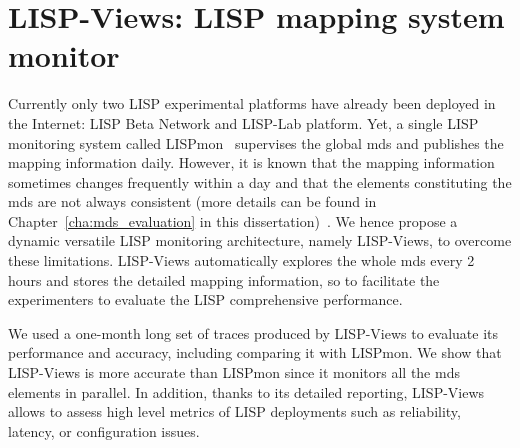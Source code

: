 
\chapter{LISP-Views: LISP mapping system monitor}
\label{cha:LISPViews}

\ifpdf
    \graphicspath{{Chapter5/Pics/Raster/}{Chapter5/Pics/PDF/}{Chapter5/}}
\else
    \graphicspath{{Chapter5/Pics/Vector/}{Chapter5/}}
\fi

Currently only two LISP experimental platforms have already been deployed in the Internet: LISP Beta Network and LISP-Lab platform. %
Yet, a single LISP monitoring system called LISPmon~\cite{lispmon} supervises the global \acrshort{mds} and publishes the mapping information daily. However, it is known that the mapping information sometimes changes frequently within a day and that the elements constituting the \acrshort{mds} are not always consistent (more details can be found in Chapter~\ref{cha:mds_evaluation} in this dissertation)~\cite{yue2016stability}. We hence propose a dynamic versatile LISP monitoring architecture, namely LISP-Views, to overcome these limitations. LISP-Views automatically explores the whole \acrshort{mds} every 2 hours and stores the detailed mapping information, so to facilitate the experimenters to evaluate the LISP comprehensive performance.

We used a one-month long set of traces produced by LISP-Views to evaluate its performance and accuracy, including comparing it with LISPmon. We show that LISP-Views is more accurate than LISPmon since it monitors all the \acrshort{mds} elements in parallel. In addition, thanks to its detailed reporting, LISP-Views allows to assess high level metrics of LISP deployments such as reliability, latency, or configuration
issues.

